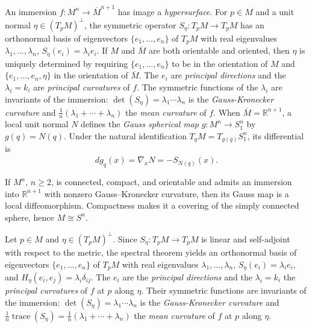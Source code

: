 \begin{example}
  \label{ex:dc-ch6-2-4}


  An immersion $f:M^n\to\overline{M}^{n+1}$ has image a \emph{hypersurface}.
  For $p\in M$ and a unit normal $\eta\in(T_pM)^\perp$, the symmetric operator
  $S_\eta:T_pM\to T_pM$ has an orthonormal basis of
  eigenvectors $\{e_1,\dots,e_n\}$ of $T_pM$ with real eigenvalues
  $\lambda_1,\dots,\lambda_n$, $S_\eta(e_i)=\lambda_i e_i$. If $M$ and $\overline{M}$
  are both orientable and oriented, then $\eta$ is uniquely determined by requiring
  $\{e_1,\dots,e_n\}$ to be in the orientation of $M$ and $\{e_1,\dots,e_n,\eta\}$ in
  the orientation of $\overline{M}$. The $e_i$ are \emph{principal directions} and the
  $\lambda_i=k_i$ are \emph{principal curvatures} of $f$. The symmetric functions of the
  $\lambda_i$ are invariants of the immersion: $\det(S_\eta)=\lambda_1\cdots\lambda_n$
  is the \emph{Gauss-Kronecker curvature} and
  $\frac{1}{n}(\lambda_1+\cdots+\lambda_n)$ the \emph{mean curvature} of $f$.
  When $\overline{M}=\mathbb{R}^{n+1}$, a local unit normal $N$ defines the
  \emph{Gauss spherical map} $g:M^n\to S_1^n$ by $g(q)=N(q)$. Under the natural
  identification $T_qM=T_{g(q)}S_1^n$, its differential is
  $$
  dg_q(x)=\overline{\nabla}_xN=-S_{N(q)}(x).
  $$
\end{example}

\begin{remark}
  \label{rem:dc-ch6-2-4-covering}


  If $M^n$, $n\geq2$, is connected, compact, and orientable and admits an
  immersion into $\mathbb R^{n+1}$ with nonzero Gauss--Kronecker curvature,
  then its Gauss map is a local diffeomorphism. Compactness makes it a covering
  of the simply connected sphere, hence $M\cong S^n$.
\end{remark}

\begin{definition}
  \label{def:dc-ch6-2-4-principal}


  Let $p\in M$ and $\eta\in(T_pM)^\perp$. Since $S_\eta:T_pM\to T_pM$ is linear
  and self-adjoint with respect to the metric, the spectral theorem yields an
  orthonormal basis of eigenvectors $\{e_1,\dots,e_n\}$ of $T_pM$ with real
  eigenvalues $\lambda_1,\dots,\lambda_n$, $S_\eta(e_i)=\lambda_ie_i$, and
  $H_\eta(e_i,e_j)=\lambda_i\delta_{ij}$. The $e_i$ are the \emph{principal
  directions} and the $\lambda_i=k_i$ the \emph{principal curvatures} of $f$ at
  $p$ along $\eta$. Their symmetric functions are invariants of the immersion:
  $\det(S_\eta)=\lambda_1\cdots\lambda_n$ is the \emph{Gauss-Kronecker
  curvature} and $\frac1n\operatorname{trace}(S_\eta)
  =\frac1n(\lambda_1+\cdots+\lambda_n)$ the \emph{mean curvature} of $f$ at $p$
  along $\eta$.
\end{definition}

